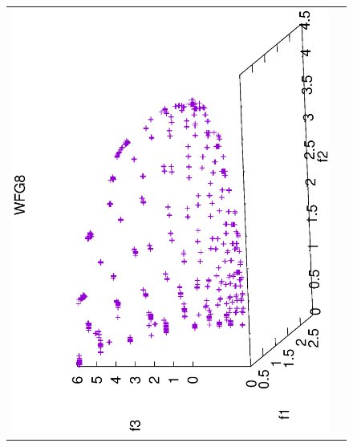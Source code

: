 \begin{figure}[H]
\begin{tabular}{cc}
  \includegraphics[scale=0.3, angle=-90,origin=c]{Figures_Chapter7/Results_Chapter4/Summary_Representative/VSD-MOEA-D/WFG8.eps} 
\end{tabular}
\end{figure}

